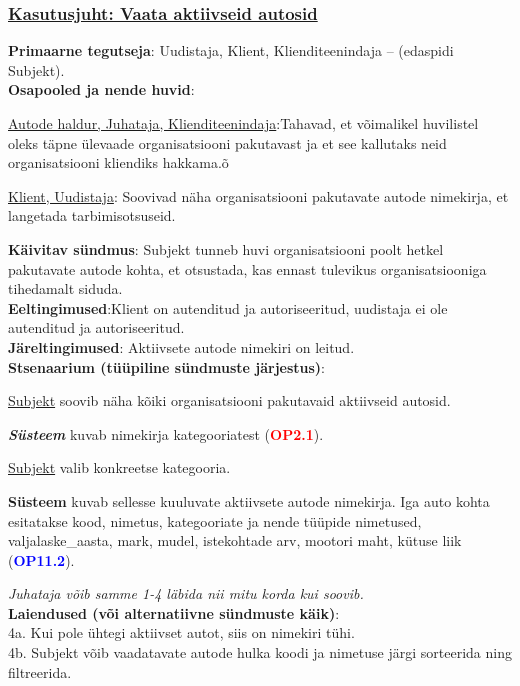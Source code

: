 \begin{shaded}
	\subsubsection{\underline{Kasutusjuht: Vaata aktiivseid autosid}}
	\textbf{Primaarne tegutseja}: Uudistaja, Klient, Klienditeenindaja – (edaspidi Subjekt). \\
	\textbf{Osapooled ja nende huvid}: 
	\useDash
	\begin{myitemize}
		\item \underline{Autode haldur, Juhataja, Klienditeenindaja}:Tahavad, et võimalikel huvilistel oleks täpne ülevaade organisatsiooni pakutavast ja et see kallutaks neid organisatsiooni kliendiks hakkama.õ
		\item \underline{Klient, Uudistaja}: Soovivad näha organisatsiooni pakutavate autode nimekirja, et langetada tarbimisotsuseid.
	\end{myitemize}
	\textbf{Käivitav sündmus}: Subjekt tunneb huvi organisatsiooni poolt hetkel pakutavate autode kohta, et otsustada, kas ennast tulevikus organisatsiooniga tihedamalt siduda. \\
	\textbf{Eeltingimused}:Klient on autenditud ja autoriseeritud, uudistaja ei ole autenditud ja autoriseeritud.\\
	\textbf{Järeltingimused}: Aktiivsete autode nimekiri on leitud. \\
	\textbf{Stsenaarium (tüüpiline sündmuste järjestus)}:
	\begin{myenumerate}
		\item \underline{Subjekt} soovib näha kõiki organisatsiooni pakutavaid aktiivseid autosid.
		\item\textit \textbf{Süsteem} kuvab nimekirja kategooriatest (\textbf{\textcolor{red}{OP2.1}}).
		\item \underline{Subjekt} valib konkreetse kategooria.
		\item \textbf{Süsteem} kuvab sellesse kuuluvate aktiivsete autode nimekirja. Iga auto kohta esitatakse kood, nimetus, kategooriate ja nende tüüpide nimetused, valjalaske\_aasta, mark, mudel, istekohtade arv, mootori maht, kütuse liik  (\textbf{\textcolor{blue}{OP11.2}}).
	\end{myenumerate}
	\textit{Juhataja võib samme 1-4 läbida nii mitu korda kui soovib. }\\
	\textbf{Laiendused  (või alternatiivne sündmuste käik)}: \\
	\indent 4a. Kui pole ühtegi aktiivset autot, siis on nimekiri tühi. \\
	\indent 4b. Subjekt võib vaadatavate autode hulka koodi ja nimetuse järgi sorteerida ning filtreerida.
\end{shaded}


